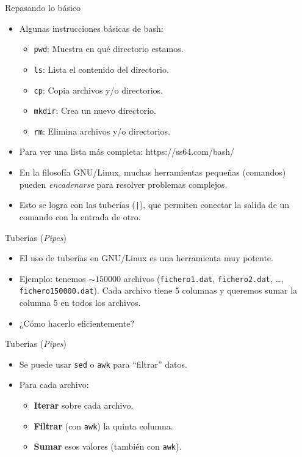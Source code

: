 \documentclass[10pt]{beamer}
\begin{document}
\begin{frame}{Repasando lo básico}
	\begin{itemize}
		\item Algunas instrucciones básicas de bash:
        \begin{itemize}
        	\item \texttt{pwd}: Muestra en qué directorio estamos.
            \item \texttt{ls}: Lista el contenido del directorio.
            \item \texttt{cp}: Copia archivos y/o directorios.
            \item \texttt{mkdir}: Crea un nuevo directorio.
            \item \texttt{rm}: Elimina archivos y/o directorios.
        \end{itemize}
        \item Para ver una lista más completa:  
              https://ss64.com/bash/
        \item En la filosofía GNU/Linux, muchas herramientas pequeñas (comandos) pueden \emph{encadenarse} para resolver problemas complejos.  
        \item Esto se logra con las tuberías (\texttt{|}), que permiten conectar la salida de un comando con la entrada de otro.
	\end{itemize}
\end{frame}

\begin{frame}[fragile]{Tuberías (\textit{Pipes})}
	\begin{itemize}
		\item El uso de tuberías en GNU/Linux es una herramienta muy potente.
        \item Ejemplo: tenemos \(\sim 150000\) archivos (\texttt{fichero1.dat}, \texttt{fichero2.dat}, …, \texttt{fichero150000.dat}). Cada archivo tiene 5 columnas y queremos sumar la columna 5 en todos los archivos.
        \item ¿Cómo hacerlo eficientemente?
	\end{itemize}
\end{frame}

\begin{frame}[fragile]{Tuberías (\textit{Pipes})}
	\begin{itemize}
		\item Se puede usar \texttt{sed} o \texttt{awk} para “filtrar” datos.
		\item Para cada archivo:
        \begin{itemize}
        	\item \textbf{Iterar} sobre cada archivo.
            \item \textbf{Filtrar} (con \texttt{awk}) la quinta columna.
            \item \textbf{Sumar} esos valores (también con \texttt{awk}).
        \end{itemize}
	\end{itemize}
\end{frame}
\end{document}
